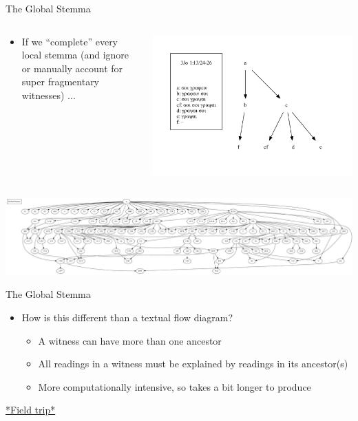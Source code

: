 \documentclass[10pt]{beamer}
\begin{document}
	\begin{frame}{The Global Stemma}
		\begin{columns}
			\begin{column}{0.45\textwidth}
				\begin{itemize}
					\item If we ``complete'' every local stemma (and ignore or manually account for super fragmentary witnesses) ...
				\end{itemize}
			\end{column}
			\begin{column}{0.45\textwidth}
				\begin{center}
					\includegraphics[width=\textwidth]{../img/B25K1V13U24-26-local-stemma-complete.pdf}
				\end{center}	
			\end{column}
		\end{columns}
		\begin{center}
			\includegraphics[width=\textwidth]{../img/global-stemma-complete.pdf}
		\end{center}	
	\end{frame}
	\begin{frame}{The Global Stemma}
		\begin{itemize}
			\item How is this different than a textual flow diagram?
			\begin{itemize}
				\item A witness can have more than one ancestor
				\item All readings in a witness must be explained by readings in its ancestor(s)
				\item More computationally intensive, so takes a bit longer to produce
			\end{itemize}
		\end{itemize}
		\begin{center}
			\href{../img/global-stemma-complete-reoriented.pdf}{*Field trip*}
		\end{center}
	\end{frame}
\end{document}
